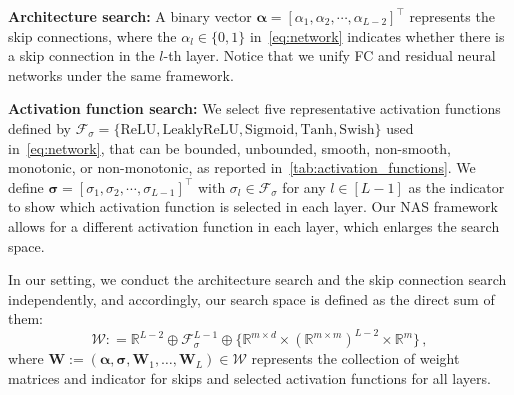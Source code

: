 \documentclass[nohyperref]{article}
\theoremstyle{plain}
\theoremstyle{definition}
\theoremstyle{remark}
\begin{document}
{\bf Architecture search:} A binary vector $\bm \alpha = [\alpha_1, \alpha_2, \cdots, \alpha_{L-2}]^{\!\top} $ represents the skip connections, where the $\alpha_l \in \{0,1 \}$ in~\cref{eq:network} indicates whether there is a skip connection in the $l$-th layer.
Notice that we unify FC and residual neural networks under the same framework.

{\bf Activation function search:} 
We select five representative activation functions defined by $\mathcal{F}_{\sigma} = \{ \mathrm{ReLU}, \mathrm{LeaklyReLU}, \mathrm{Sigmoid}, \mathrm{Tanh}, \mathrm{Swish} \}$ used in~\cref{eq:network},  that can be bounded, unbounded, smooth, non-smooth, monotonic, or non-monotonic, as reported in~\cref{tab:activation_functions}.
We define $\bm \sigma =[\sigma_1, \sigma_2, \cdots, \sigma_{L-1}]^{\!\top}$ with $\sigma_l \in \mathcal{F}_{\sigma}$ for any $l \in [L-1]$ as the indicator to show which activation function is selected in each layer.
Our NAS framework allows for a different activation function in each layer, which enlarges the search space.




 
In our setting, we conduct the architecture search and the skip connection search independently, and accordingly, our search space is defined as the direct sum of them:
\begin{equation}
\mathcal{W} : =  \mathbb{R}^{L-2} \oplus \mathcal{F}_{\sigma}^{L-1}  \oplus \{ \mathbb{R}^{m\times d} \times (\mathbb{R}^{m\times m})^{L-2}\times \mathbb{R}^{m} \}  \,,  
\label{eq:problem_setting_parameter_space}
\end{equation}
where $\bm{W} := ( \bm \alpha, \bm \sigma, \bm{W}_1, \dots , \bm{W}_L) \in \mathcal{W}$ represents the collection of weight matrices and indicator for skips and selected activation functions for all layers.
\end{document}
